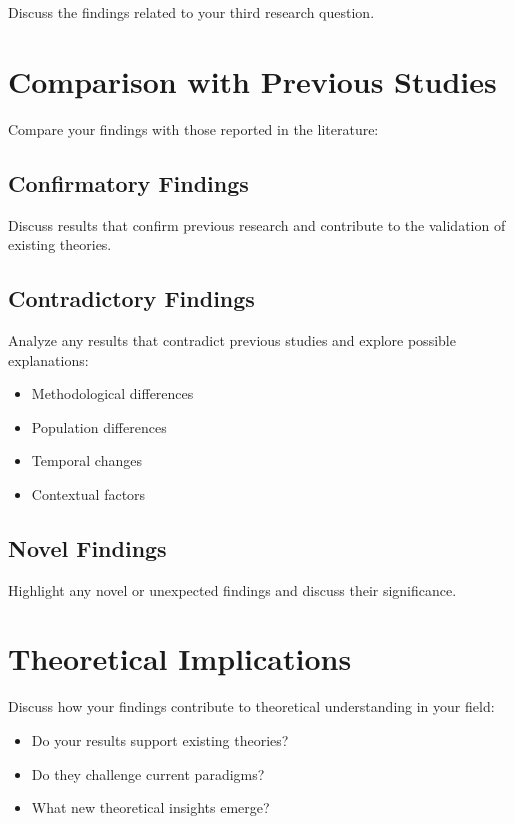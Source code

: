 Discuss the findings related to your third research question.

\section{Comparison with Previous Studies}

Compare your findings with those reported in the literature:

\subsection{Confirmatory Findings}

Discuss results that confirm previous research and contribute to the validation of existing theories.

\subsection{Contradictory Findings}

Analyze any results that contradict previous studies and explore possible explanations:

\begin{itemize}
    \item Methodological differences
    \item Population differences
    \item Temporal changes
    \item Contextual factors
\end{itemize}

\subsection{Novel Findings}

Highlight any novel or unexpected findings and discuss their significance.

\section{Theoretical Implications}

Discuss how your findings contribute to theoretical understanding in your field:

\begin{itemize}
    \item Do your results support existing theories?
    \item Do they challenge current paradigms?
    \item What new theoretical insights emerge?
\end{itemize}

